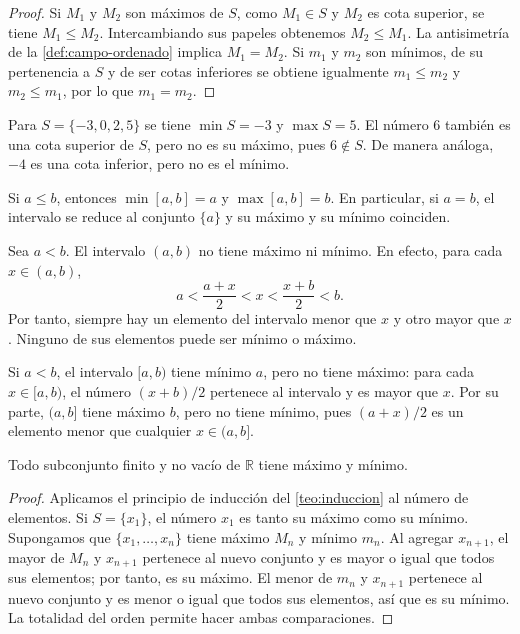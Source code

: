 \begin{proof}
Si $M_1$ y $M_2$ son máximos de $S$, como $M_1\in S$ y $M_2$ es cota superior, se tiene $M_1\leq M_2$. Intercambiando sus papeles obtenemos $M_2\leq M_1$. La antisimetría de la \cref{def:campo-ordenado} implica $M_1=M_2$. Si $m_1$ y $m_2$ son mínimos, de su pertenencia a $S$ y de ser cotas inferiores se obtiene igualmente $m_1\leq m_2$ y $m_2\leq m_1$, por lo que $m_1=m_2$.
\end{proof}

\begin{example}
Para $S=\{-3,0,2,5\}$ se tiene $\min S=-3$ y $\max S=5$. El número $6$ también es una cota superior de $S$, pero no es su máximo, pues $6\notin S$. De manera análoga, $-4$ es una cota inferior, pero no es el mínimo.
\end{example}

\begin{example}
Si $a\leq b$, entonces $\min[a,b]=a$ y $\max[a,b]=b$. En particular, si $a=b$, el intervalo se reduce al conjunto $\{a\}$ y su máximo y su mínimo coinciden.
\end{example}

\begin{example}
Sea $a<b$. El intervalo $(a,b)$ no tiene máximo ni mínimo. En efecto, para cada $x\in(a,b)$,
\[
 a<\frac{a+x}{2}<x<\frac{x+b}{2}<b.
\]
Por tanto, siempre hay un elemento del intervalo menor que $x$ y otro mayor que $x$. Ninguno de sus elementos puede ser mínimo o máximo.
\end{example}

\begin{example}
Si $a<b$, el intervalo $[a,b)$ tiene mínimo $a$, pero no tiene máximo: para cada $x\in[a,b)$, el número $(x+b)/2$ pertenece al intervalo y es mayor que $x$. Por su parte, $(a,b]$ tiene máximo $b$, pero no tiene mínimo, pues $(a+x)/2$ es un elemento menor que cualquier $x\in(a,b]$.
\end{example}

\begin{samepage}
\begin{proposition}
\label{prop:extremos-finitos}
Todo subconjunto finito y no vacío de $\mathbb{R}$ tiene máximo y mínimo.
\end{proposition}
\end{samepage}

\begin{proof}
Aplicamos el principio de inducción del \cref{teo:induccion} al número de elementos. Si $S=\{x_1\}$, el número $x_1$ es tanto su máximo como su mínimo. Supongamos que $\{x_1,\ldots,x_n\}$ tiene máximo $M_n$ y mínimo $m_n$. Al agregar $x_{n+1}$, el mayor de $M_n$ y $x_{n+1}$ pertenece al nuevo conjunto y es mayor o igual que todos sus elementos; por tanto, es su máximo. El menor de $m_n$ y $x_{n+1}$ pertenece al nuevo conjunto y es menor o igual que todos sus elementos, así que es su mínimo. La totalidad del orden permite hacer ambas comparaciones.
\end{proof}

